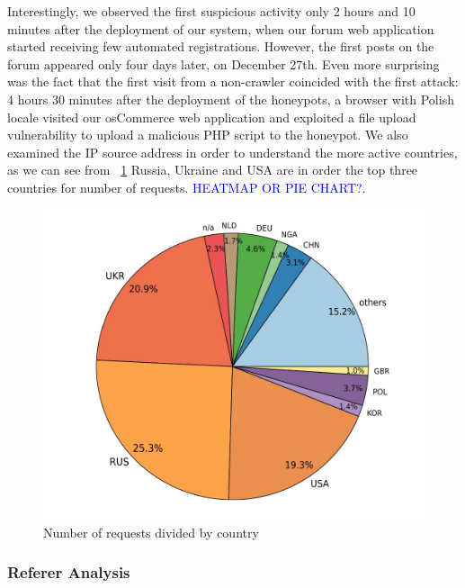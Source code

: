 Interestingly, we observed the first suspicious activity only 2 hours and 10 minutes after the deployment of our system, when our forum web application started receiving few automated registrations. However, the first posts on the forum appeared only four days later, on December 27th. Even more surprising was the fact that the first visit from a non-crawler coincided with the first attack: 4 hours 30 minutes after the deployment of the honeypots, a browser with Polish locale visited our osCommerce web application and exploited a file upload vulnerability to upload a malicious PHP script to the honeypot. We also examined the IP source address in order to understand the more active countries, as we can see from ~\ref{fig:requests_countries} Russia, Ukraine and USA are in order the top three countries for number of requests. \textcolor{blue}{HEATMAP OR PIE CHART?}.

\begin{figure}[tbh]
\centerline{\includegraphics[scale=0.5]{Images/requests_countries.jpg}}
\caption{Number of requests divided by country\label{fig:requests_countries}}
\end{figure}

\subsubsection{Referer Analysis}

